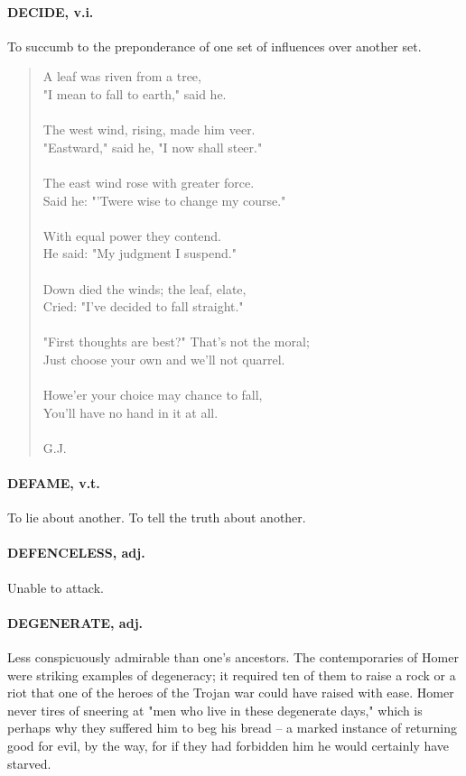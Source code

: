\documentclass[11pt]{article}
\begin{document}
\paragraph{DECIDE, v.i.}  To succumb to the preponderance of one set of influences
over another set.

\begin{quote}   A leaf was riven from a tree, \\
  "I mean to fall to earth," said he. \\
 \\
  The west wind, rising, made him veer. \\
  "Eastward," said he, "I now shall steer." \\
 \\
  The east wind rose with greater force. \\
  Said he:  "'Twere wise to change my course." \\
 \\
  With equal power they contend. \\
  He said:  "My judgment I suspend." \\
 \\
  Down died the winds; the leaf, elate, \\
  Cried:  "I've decided to fall straight." \\
 \\
  "First thoughts are best?"  That's not the moral; \\
  Just choose your own and we'll not quarrel. \\
 \\
  Howe'er your choice may chance to fall, \\
  You'll have no hand in it at all. \\
 \\
G.J. \end{quote}


\paragraph{DEFAME, v.t.}  To lie about another.  To tell the truth about another.

\paragraph{DEFENCELESS, adj.}  Unable to attack.

\paragraph{DEGENERATE, adj.}  Less conspicuously admirable than one's ancestors.
The contemporaries of Homer were striking examples of degeneracy; it
required ten of them to raise a rock or a riot that one of the heroes
of the Trojan war could have raised with ease.  Homer never tires of
sneering at "men who live in these degenerate days," which is perhaps
why they suffered him to beg his bread -- a marked instance of
returning good for evil, by the way, for if they had forbidden him he
would certainly have starved.
\end{document}

